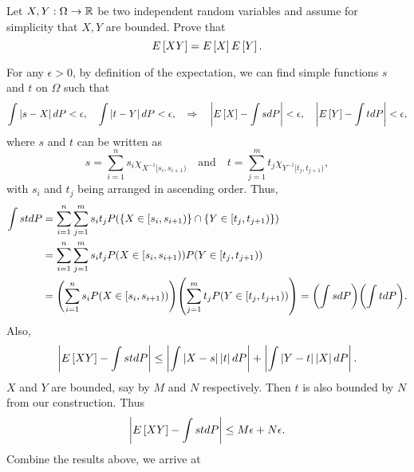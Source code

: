 \begin{exercise}{2.5}\label{ex:2.5}
    Let $X,Y:\Omega\to\mathbb{R}$ be two independent random variables and assume for simplicity 
    that $X,Y$ are bounded. Prove that 
    \begin{equation*}
        E\left[ {XY} \right] = E\left[ {X} \right]E\left[ {Y} \right].
    \end{equation*}
\end{exercise}
\begin{solution}
    For any $\epsilon>0$, by definition of the expectation, we can find simple functions 
    $s$ and $t$ on $\Omega$ such that 
    \begin{equation*}
        \int\left\lvert {s-X} \right\rvert dP < \epsilon, \quad
        \int\left\lvert {t-Y} \right\rvert dP < \epsilon, \quad\Rightarrow\quad
        \left\lvert {E\left[ {X} \right] - \int s dP} \right\rvert < \epsilon, \quad
        \left\lvert {E\left[ {Y} \right] - \int t dP} \right\rvert < \epsilon,
    \end{equation*}
    where $s$ and $t$ can be written as 
    \begin{equation*}
        s = \sum_{i=1}^n s_i \chi_{X^{-1}[s_i,s_{i+1})}\quad\text{and}\quad
        t = \sum_{j=1}^m t_j \chi_{Y^{-1}[t_j,t_{j+1})},
    \end{equation*}
    with $s_i$ and $t_j$ being arranged in ascending order. Thus, 
    \begin{equation*}
        \begin{split}
            \int st dP &= \sum_{i=1}^n\sum_{j=1}^m s_i t_j P(\set{X\in [s_i,s_{i+1})}\cap \set{Y\in [t_j,t_{j+1})}) \\
            &= \sum_{i=1}^n\sum_{j=1}^m s_i t_j P(X\in [s_i,s_{i+1}))P(Y\in [t_j,t_{j+1})) \\
            &= \pth{\sum_{i=1}^n s_i P(X\in [s_i,s_{i+1}))}\pth{\sum_{j=1}^m t_j P(Y\in [t_j,t_{j+1}))} 
            = \pth{\int s dP} \pth{\int t dP}.
        \end{split}
    \end{equation*}
    Also, 
    \begin{equation*}
        \left\lvert {E\left[ {XY} \right] - \int stdP} \right\rvert 
        \leq \left\lvert {\int \left\lvert {X-s} \right\rvert\left\lvert {t} \right\rvert dP} \right\rvert + \left\lvert {\int \left\lvert {Y-t} \right\rvert\left\lvert {X} \right\rvert dP} \right\rvert.
    \end{equation*}
    $X$ and $Y$ are bounded, say by $M$ and $N$ respectively. Then $t$ is also 
    bounded by $N$ from our construction. Thus 
    \begin{equation*}
        \left\lvert {E\left[ {XY} \right] - \int stdP} \right\rvert \leq M\epsilon + N\epsilon.
    \end{equation*}
    Combine the results above, we arrive at
    \begin{equation*}

\end{equation*}
\end{solution}
